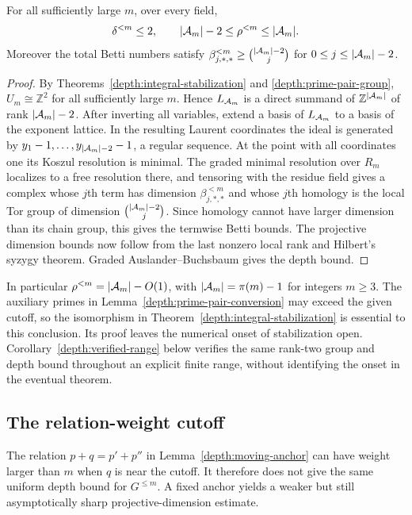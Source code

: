 \begin{corollary}
\label{depth:bounded-depth}
For all sufficiently large $m$, over every field,
\[
 \delta^{<m}\le2,\qquad
 |\mathcal A_m|-2\le\rho^{<m}\le |\mathcal A_m|.
\]
Moreover the total Betti numbers satisfy
$\beta^{<m}_{j,*,*}\ge\binom{|\mathcal A_m|-2}{j}$ for $0\le j\le |\mathcal A_m|-2$.
\end{corollary}
\begin{proof}
By Theorems~\ref{depth:integral-stabilization} and
\ref{depth:prime-pair-group}, $U_m\cong\mathbb Z^2$ for all
sufficiently large $m$. Hence $L_{\mathcal A_m}$ is a direct summand of
$\mathbb Z^{|\mathcal A_m|}$ of rank $|\mathcal A_m|-2$. After inverting all variables,
extend a basis of $L_{\mathcal A_m}$ to a basis of the exponent lattice.
In the resulting Laurent coordinates the ideal is generated by
$y_1-1,\ldots,y_{|\mathcal A_m|-2}-1$, a regular sequence. At the point with
all coordinates one its Koszul resolution is minimal. The graded
minimal resolution over $R_m$ localizes to a free resolution there,
and tensoring with the residue field gives a complex whose $j$th term
has dimension $\beta^{<m}_{j,*,*}$ and whose $j$th homology is the
local Tor group of dimension $\binom{|\mathcal A_m|-2}{j}$. Since homology
cannot have larger dimension than its chain group, this gives the
termwise Betti bounds. The
projective dimension bounds now follow from the last nonzero local
rank and Hilbert's syzygy theorem. Graded Auslander--Buchsbaum gives
the depth bound.
\end{proof}

In particular $\rho^{<m}=|\mathcal A_m|-O(1)$, with
$|\mathcal A_m|=\pi(m)-1$ for integers $m\ge3$. The auxiliary primes in
Lemma~\ref{depth:prime-pair-conversion} may exceed the given cutoff,
so the isomorphism in Theorem~\ref{depth:integral-stabilization} is
essential to this conclusion. Its proof leaves the numerical onset of
stabilization open. Corollary~\ref{depth:verified-range} below verifies
the same rank-two group and depth bound throughout an explicit finite
range, without identifying the onset in the eventual theorem.

\subsection{The relation-weight cutoff}

The relation $p+q=p'+p''$ in Lemma~\ref{depth:moving-anchor} can have weight
larger than $m$ when $q$ is near the cutoff. It therefore does not give
the same uniform depth bound for $G^{\le m}$. A fixed anchor yields a
weaker but still asymptotically sharp projective-dimension estimate.

